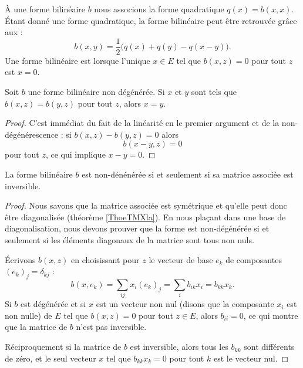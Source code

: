À une forme bilinéaire \( b\) nous associons la forme quadratique \( q(x)=b(x,x)\). Étant donné une forme quadratique, la forme bilinéaire peut être retrouvée grâce aux  :
\begin{equation}    \label{EqMrbsop}
    b(x,y)=\frac{ 1 }{2}\big( q(x)+q(y)-q(x-y) \big).
\end{equation}
Une forme bilinéaire est  lorsque l'unique \( x\in E\) tel que \( b(x,z)=0\) pour tout \( z\) est \( x=0\).

\begin{lemma}   \label{LemyKJpVP}
    Soit \( b\) une forme bilinéaire non dégénérée. Si \( x\) et \( y\) sont tels que \( b(x,z)=b(y,z)\) pour tout \( z\), alors \( x=y\).
\end{lemma}

\begin{proof}
    C'est immédiat du fait de la linéarité en le premier argument et de la non-dégénérescence : si \( b(x,z)-b(y,z)=0\) alors
    \begin{equation}
        b(x-y,z)=0
    \end{equation}
    pour tout \( z\), ce qui implique \( x-y=0\).
\end{proof}

\begin{proposition}
    La forme bilinéaire \( b\) est non-dénénérée si et seulement si sa matrice associée est inversible.
\end{proposition}

\begin{proof}
    Nous savons que la matrice associée est symétrique et qu'elle peut donc être diagonalisée (théorème \ref{ThoeTMXla}). En nous plaçant dans une base de diagonalisation, nous devons prouver que la forme est non-dégénérée si et seulement si les éléments diagonaux de la matrice sont tous non nuls.

    Écrivons \( b(x,z)\) en choisissant pour \( z\) le vecteur de base \( e_k\) de composantes \( (e_k)_j=\delta_{kj}\) :
    \begin{equation}
            b(x,e_k)=\sum_{ij}x_i(e_k)_j
            =\sum_i b_{ik}x_i
            =b_{kk}x_k.
    \end{equation}
    Si \( b\) est dégénérée et si \( x\) est un vecteur non nul (disons que la composante \( x_i\) est non nulle) de \( E\) tel que \( b(x,z)=0\) pour tout \( z\in E\), alors \( b_{ii}=0\), ce qui montre que la matrice de \( b\) n'est pas inversible.

    Réciproquement si la matrice de \( b\) est inversible, alors tous les \( b_{kk}\) sont différents de zéro, et le seul vecteur \( x\) tel que \( b_{kk}x_k=0\) pour tout \( k\) est le vecteur nul.
\end{proof}

